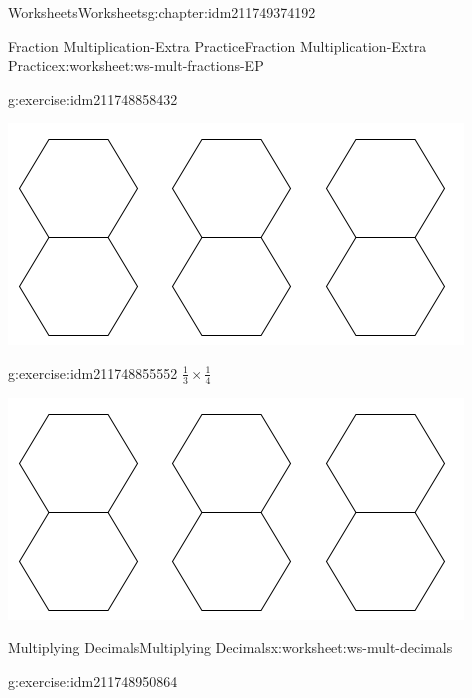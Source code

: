 \documentclass[twoside,11pt,]{book}
\begin{document}
\begin{chapterptx}{Worksheets}{}{Worksheets}{}{}{g:chapter:idm211749374192}
\begin{worksheet-section-numberless}{Fraction Multiplication-Extra Practice}{}{Fraction Multiplication-Extra Practice}{}{}{x:worksheet:ws-mult-fractions-EP}
\begin{divisionexercise}{5}{}{}{g:exercise:idm211748858432}
\begin{sidebyside}{1}{0.1}{0.1}{0}
\begin{sbspanel}{0.8}
\includegraphics[width=1\linewidth]{images/3-double-hexagons.png}
\end{sbspanel}%
\end{sidebyside}%
\end{divisionexercise}%
\begin{divisionexercise}{6}{}{}{g:exercise:idm211748855552}%
\(\frac{1}{3} \times \frac{1}{4} \)%
\begin{sidebyside}{1}{0.1}{0.1}{0}%
\begin{sbspanel}{0.8}%
\includegraphics[width=1\linewidth]{images/3-double-hexagons.png}
\end{sbspanel}%
\end{sidebyside}%
\end{divisionexercise}%
\end{worksheet-section-numberless}
\restoregeometry
%
%
\typeout{************************************************}
\typeout{************************************************}
%
\begin{worksheet-section-numberless}{Multiplying Decimals}{}{Multiplying Decimals}{}{}{x:worksheet:ws-mult-decimals}
\begin{divisionexercise}{1}{}{}{g:exercise:idm211748950864}%

\end{divisionexercise}
\end{worksheet-section-numberless}
\end{chapterptx}
\end{document}
